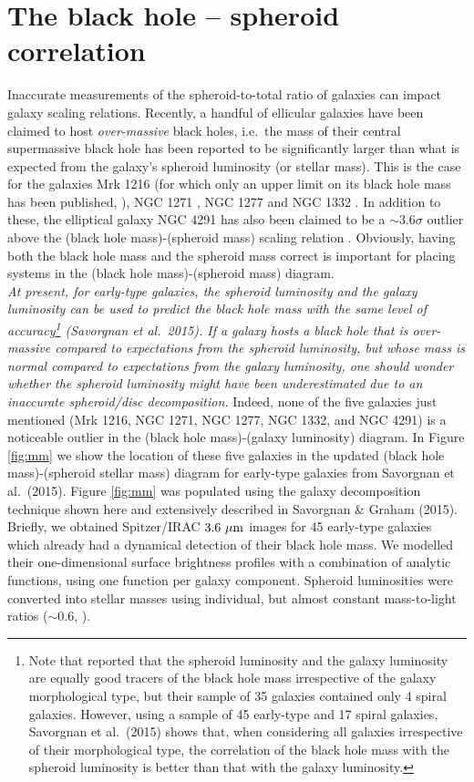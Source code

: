 \documentclass[useAMS,usenatbib,article]{mn2e}
\begin{document}
\section{The black hole -- spheroid correlation}
\label{sec:mm}
Inaccurate measurements of the spheroid-to-total ratio of galaxies can impact galaxy scaling relations. 
Recently, a handful of ellicular galaxies have been claimed to host \emph{over-massive} black holes, 
i.e.~the mass of their central supermassive black hole has been reported to be significantly larger 
than what is expected from the galaxy's spheroid luminosity (or stellar mass).
This is the case for the galaxies Mrk 1216 (for which only an upper limit on its black hole mass has been published, 
\citealt{yildirim2015}), NGC 1271 \citep{walsh2015}, 
NGC 1277 \citep{vandenbosch2012,yildirim2015} and NGC 1332 \citep{rusli2011}.
In addition to these, the elliptical galaxy NGC 4291 has also been claimed to be a $\sim$$3.6\sigma$ outlier 
above the (black hole mass)-(spheroid mass) scaling relation \citep{bogdan2012}. 
Obviously, having both the black hole mass and the spheroid mass correct is important 
for placing systems in the (black hole mass)-(spheroid mass) diagram. \\
\emph{At present, for early-type galaxies, the spheroid luminosity and the galaxy luminosity 
can be used to predict the black hole mass with the same level of accuracy\footnote{Note that 
\cite{lasker2014anal} reported that the spheroid luminosity and the galaxy luminosity are equally good tracers of the black hole mass 
irrespective of the galaxy morphological type, but their sample of 35 galaxies contained only 4 spiral galaxies. 
However, using a sample of 45 early-type and 17 spiral galaxies, 
Savorgnan et al.~(2015) shows that, when considering all galaxies irrespective of their morphological type, 
the correlation of the black hole mass with the spheroid luminosity is better than that with the galaxy luminosity.} 
(Savorgnan et al.~2015). 
If a galaxy hosts a black hole that is over-massive compared to expectations from the spheroid luminosity, 
but whose mass is normal compared to expectations from the galaxy luminosity, 
one should wonder whether the spheroid luminosity might have been underestimated 
due to an inaccurate spheroid/disc decomposition. }
Indeed, none of the five galaxies just mentioned (Mrk 1216, NGC 1271, NGC 1277, NGC 1332, and NGC 4291) is a noticeable outlier 
in the (black hole mass)-(galaxy luminosity) diagram. 
In Figure \ref{fig:mm} we show the location of these five galaxies in the updated (black hole mass)-(spheroid stellar mass) diagram 
for early-type galaxies from Savorgnan et al.~(2015). 
Figure \ref{fig:mm} was populated using the galaxy decomposition technique shown here 
and extensively described in Savorgnan \& Graham (2015). 
Briefly, we obtained Spitzer/IRAC $3.6~\rm \mu m$ images for 45 early-type galaxies 
which already had a dynamical detection of their black hole mass. 
We modelled their one-dimensional surface brightness profiles with a combination of analytic functions, 
using one function per galaxy component. 
Spheroid luminosities were converted into stellar masses using individual, 
but almost constant mass-to-light ratios ($\sim$$0.6$, \citealt{meidt2014-MNRAS}). \\
\end{document}
